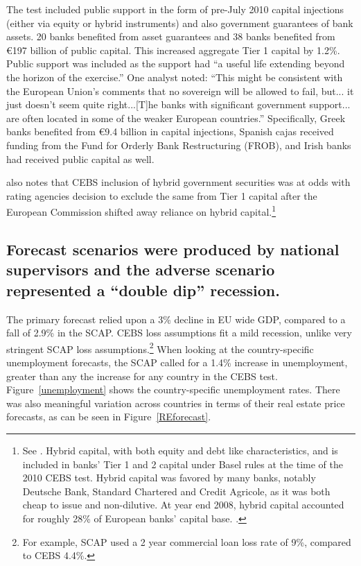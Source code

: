 \documentclass[12pt]{article}
\begin{document}
The test included public support in the form of pre-July 2010 capital injections (either via equity or hybrid instruments) and also government guarantees of bank assets. 20 banks benefited from asset guarantees and 38  banks benefited from \euro{197} billion of public capital. This increased aggregate Tier 1 capital by 1.2\%. Public support was included as the support had ``a useful life extending beyond the horizon of the exercise.'' One analyst noted: ``This might be consistent with the European Union's comments that no sovereign will be allowed to fail, but... it just doesn't seem quite right...[T]he banks with significant government support... are often located in some of the weaker European countries.'' \citep{Alloway} Specifically, Greek banks benefited from \euro{9.4} billion in capital injections, Spanish cajas received funding from the Fund for Orderly Bank Restructuring (FROB), and Irish banks had received public capital as well.

\citet{Alloway} also notes that CEBS inclusion of hybrid government securities was at odds with rating agencies decision to exclude the same from Tier 1 capital after the European Commission shifted away reliance on hybrid capital.\footnote{See \citet{Fitch}. Hybrid capital, with both equity and debt like characteristics, and is included in banks' Tier 1 and 2 capital under Basel rules at the time of the 2010 CEBS test. Hybrid capital was favored by many banks, notably Deutsche Bank, Standard Chartered and Credit Agricole, as it was both cheap to issue and non-dilutive. At year end 2008, hybrid capital accounted for roughly 28\% of European banks' capital base. \citep{Alloway2}.}

\subsection{Forecast scenarios were produced by national supervisors and the adverse scenario represented a ``double dip'' recession.}

The primary forecast relied upon a 3\% decline in EU wide GDP, compared to a fall of 2.9\% in the SCAP.  CEBS loss assumptions fit a mild recession, unlike very stringent SCAP loss assumptions.\footnote{For example, SCAP used a 2 year commercial loan loss rate of 9\%, compared to CEBS 4.4\%.} When looking at the country-specific unemployment forecasts, the SCAP called for a 1.4\% increase in unemployment, greater than any the increase for any country in the CEBS test. Figure~\ref{unemployment} shows the country-specific unemployment rates. There was also meaningful variation across countries in terms of their real estate price forecasts, as can be seen in Figure~\ref{REforecast}.
\end{document}
